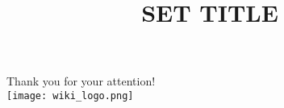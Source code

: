 \documentclass[xcolor=dvipsnames]{beamer}
\title{ SET TITLE }
\newcommand{\textSlide}[1]{
    \begin{frame}
        \Huge
    	\begin{center}
    		#1
    	\end{center}
    \end{frame}
}
\begin{document}
\Large
\begin{frame}
	\titlepage
\end{frame}

\textSlide{\huge Thank you for your attention! \vspace{1.5cm} \\ \texttt{[image: wiki\_logo.png]}}
\end{document}
